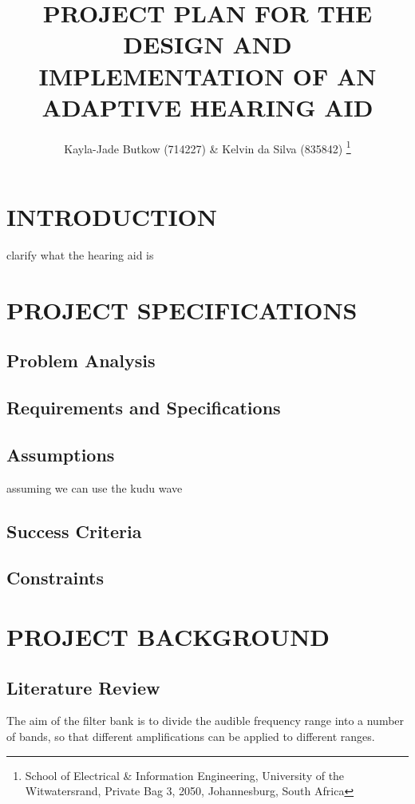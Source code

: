 \documentclass[10pt,twocolumn]{witseiepaper}
\begin{document}
\title{PROJECT PLAN FOR THE DESIGN AND IMPLEMENTATION OF AN ADAPTIVE HEARING AID}

\author{Kayla-Jade Butkow (714227) \& Kelvin da Silva (835842) 
\thanks{School of Electrical \& Information Engineering, University of the
Witwatersrand, Private Bag 3, 2050, Johannesburg, South Africa}
}


%
\abstract{ }

\keywords{}

\maketitle
\thispagestyle{empty}
\pagestyle{plain}
\setcounter{page}{1}

%
\section{INTRODUCTION}
clarify what the hearing aid is
\section{PROJECT SPECIFICATIONS}
\subsection{Problem Analysis}
\subsection{Requirements and Specifications}
\subsection{Assumptions}
assuming we can use the kudu wave
\subsection{Success Criteria}
\subsection{Constraints}

\section{PROJECT BACKGROUND}
\subsection{Literature Review}
The aim of the filter bank is to divide the audible frequency range into a number of bands, so that different amplifications can be applied to different ranges.
\end{document}
